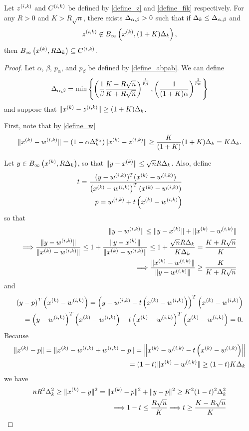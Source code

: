 \begin{lemma}
\label{large_zik_means_means_no_intersection}
Let
${z^{(i, k)}}$ and ${C^{(i, k)}}$
be defined by
\cref{define_z} and \cref{define_fik} respectively.
For any $R > 0$ and $K > R\sqrt{n}$, there exists ${\Delta_{\alpha,\beta}} > 0$ such that if $\Delta_k \le {\Delta_{\alpha,\beta}}$ and 
\begin{align*}
{z^{(i, k)}} \not \in B_{\infty}\left(x^{(k)}, (1+K) \Delta_k\right),
\end{align*}
then $B_{\infty}\left(x^{(k)}, R \Delta_k\right) \subseteq {C^{(i, k)}}$.
\end{lemma}
\begin{proof}
Let $\alpha$, $\beta$, $p_{\alpha}$, and $p_{\beta}$ be defined by \cref{define_abpab}.
We can define
\begin{align}
{\Delta_{\alpha,\beta}} = \min\left\{
\left(\frac 1 {\beta }\frac {K - R\sqrt{n}}{K + R\sqrt{n}}\right)^{\frac 1 {p_{\beta }}},
\left(\frac 1 {(1+K)\alpha}\right)^{\frac 1 {p_{\alpha}}}
\right\} \label{define_deltalargzik}
\end{align}
and suppose that $\|x^{(k)} - {z^{(i, k)}}\| \ge (1+K) \Delta_k$.

First, note that by \cref{define_w}
\begin{align*}
\|x^{(k)} - {w^{(i, k)}}\| = (1 - \alpha\Delta_k^{p_{\alpha}}) \|x^{(k)} - {z^{(i, k)}}\| \ge \frac {K} {(1+K)} (1+K)\Delta_k = K\Delta_k.
\end{align*}

Let $y \in B_{\infty}\left(x^{(k)}, R \Delta_k\right)$, so that $\|y - x^{(k)}\| \le \sqrt{n}R\Delta_k$.
Also, define
\begin{align*}
t  = \frac{(y - {w^{(i, k)}})^T(x^{(k)} - {w^{(i, k)}})}{\left(x^{(k)} - {w^{(i, k)}}\right)^T(x^{(k)} - {w^{(i, k)}})} \\
p = {w^{(i, k)}} + t\left(x^{(k)} - {w^{(i, k)}}\right)
\end{align*}
so that
\begin{align*}
\|y - {w^{(i, k)}}\| \le \|y - x^{(k)}\| + \|x^{(k)} - {w^{(i, k)}}\| \\
\Longrightarrow \frac{\|y - {w^{(i, k)}}\|}{\|x^{(k)} - {w^{(i, k)}}\|} \le 1 +  \frac{\|y - x^{(k)}\|}{\|x^{(k)} - {w^{(i, k)}}\|} 
\le 1 + \frac{\sqrt{n}R\Delta_k}{K \Delta_k} = \frac {K+R\sqrt{n}}{K} \\
\Longrightarrow \frac{\|x^{(k)} - {w^{(i, k)}}\|}{\|y - {w^{(i, k)}}\|} \ge \frac {K}{K+R\sqrt{n}}
\end{align*}
and
\begin{align*}
\left(y - p\right)^T\left(x^{(k)} - {w^{(i, k)}}\right) = 
\left(y - {w^{(i, k)}} - t\left(x^{(k)} - {w^{(i, k)}}\right)\right)^T\left(x^{(k)} - {w^{(i, k)}}\right) \\
= \left(y - {w^{(i, k)}}\right)^T\left(x^{(k)} - {w^{(i, k)}}\right) - t\left(x^{(k)} - {w^{(i, k)}}\right)^T\left(x^{(k)} - {w^{(i, k)}}\right) = 0.
\end{align*}
Because
\begin{align*}
\|x^{(k)} - p\| = \|x^{(k)} - {w^{(i, k)}} + {w^{(i, k)}} - p\| = \left\|x^{(k)} - {w^{(i, k)}} - t\left(x^{(k)} - {w^{(i, k)}}\right)\right\| \\
= (1-t)\|x^{(k)} - {w^{(i, k)}}\| \ge (1-t)K\Delta_k
\end{align*}
we have
\begin{align*}
nR^2\Delta_k^2 \ge \|x^{(k)} - y\|^2 = \|x^{(k)} - p\|^2 + \|y - p\|^2 \ge K^2(1-t)^2\Delta_k^2  \\
\Longrightarrow 1-t \le \frac {R\sqrt{n}} {K} 
\Longrightarrow t \ge \frac {K - R\sqrt{n}}{K}
\end{align*}


\end{proof}

